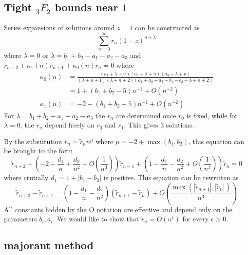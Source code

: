 \documentclass[10pt]{article}
\numberwithin{equation}{section}
\begin{document}
\subsection{Tight ${}_3 F_2$ bounds near $1$}

Series expansions of solutions around $z=1$ can be constructed as
\begin{equation*}
\sum_{n=0}^{\infty} r_n (1-z)^{n+\lambda}
\end{equation*}
where $\lambda =0$ or $\lambda = b_1+b_2-a_1-a_2-a_3$ and $r_{n+2} + \kappa_1(n) r_{n+1} + \kappa_0(n) r_n = 0$ where
\begin{align*}
\kappa_0(n) &= \frac{\left(a_1+\lambda +n\right) \left(a_2+\lambda
   +n\right) \left(a_3+\lambda +n\right)}{(\lambda +n+1)
   (\lambda +n+2) \left(a_1+a_2+a_3-b_1-b_2+\lambda
   +n+2\right)}\\
&=1 + \left(b_1+b_2-5 \right) n^{-1} + O(n^{-2})\\
\kappa_1(n) &=-2 - \left(b_1+b_2-5 \right) n^{-1} + O(n^{-2})
\end{align*}
For $\lambda = b_1+b_2-a_1-a_2-a_3$ the $r_n$ are determined once $r_0$ is fixed, while for $\lambda = 0$, the $r_n$ depend freely on $r_0$ and $r_1$. This gives $3$ solutions.

By the substitution $r_n = \tilde{r}_n n^\mu$ where $\mu = -2 + \operatorname{max}(b_1,b_2)$, this equation can be brought to the form
\begin{equation*}
\tilde{r}_{n+2} + \left(-2 + \frac{d_1}{n} + \frac{d_2}{n^2} + O(\frac{1}{n^3}) \right) \tilde{r}_{n+1} + \left(1 - \frac{d_1}{n} - \frac{d_2}{n^2} + O(\frac{1}{n^3}) \right) \tilde{r}_{n} = 0
\end{equation*}
where crutially $d_1 = 1 + |b_1-b_2|$ is positive. This equation can be rewritten as
\begin{equation*}
\tilde{r}_{n+2} - \tilde{r}_{n+1} = \left(1 - \frac{d_1}{n} - \frac{d_2}{n^2} \right) (\tilde{r}_{n+1} - \tilde{r}_{n}) + O(\frac{\operatorname{max}(|\tilde{r}_{n+1}|, |\tilde{r}_{n}|)}{n^3})
\end{equation*}
All constants hidden by the O notation are effective and depend only on the parameters $b_i,a_i$. We would like to show that $\tilde{r}_{n} = O(n^{\epsilon})$ for every $\epsilon > 0$.


\subsection{majorant method}
\end{document}
